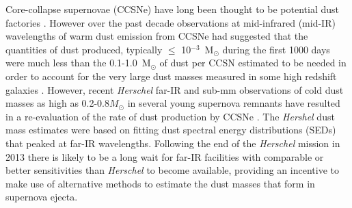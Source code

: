 \documentclass[useAMS,usenatbib,usegraphicx]{mnras}
\begin{document}
%   

Core-collapse supernovae (CCSNe) have long been thought to be potential 
dust factories \citep{Hoyle1970, Kozasa1991, Todini2001}. However 
over the past decade observations at mid-infrared (mid-IR) wavelengths of 
warm dust emission from CCSNe had suggested that the quantities of dust 
produced, typically $\leq$ 10$^{-3}$~M$_\odot$ during the first 1000 days 
\citep{Sugerman2006, Meikle2007, Kotak2009, Andrews2010, Fabbri2011} were 
much less than the 0.1-1.0~M$_\odot$ of dust per CCSN  
estimated to be needed \citep{Morgan2003, Dwek2007} in order to account 
for the very large dust masses measured in some high redshift galaxies 
\citep{Omont2001, Bertoldi2003, Watson2015}. However, recent {\em 
Herschel} far-IR and sub-mm observations of cold dust masses as high as 
0.2-0.8$M_{\odot}$ in several young supernova remnants have resulted in a 
re-evaluation of the rate of dust production by CCSNe \citep{Barlow2010, 
Matsuura2011, Gomez2012}. The {\em Hershel} dust mass estimates were based 
on fitting dust spectral energy distributions (SEDs) that peaked at far-IR 
wavelengths. Following the end of the {\em Herschel} mission in 
2013 there is likely to be a long wait for far-IR facilities with 
comparable or better sensitivities than {\em Herschel} to become 
available, providing an incentive to make use of alternative methods to 
estimate the dust masses that form in supernova ejecta.
\end{document}
